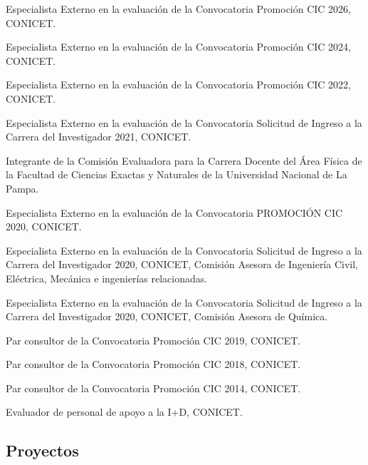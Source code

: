 \begin{timeline}
 Especialista Externo en la evaluación de la Convocatoria Promoción CIC 2026, CONICET.

 Especialista Externo en la evaluación de la Convocatoria Promoción CIC 2024, CONICET.

 Especialista Externo en la evaluación de la Convocatoria Promoción CIC 2022, CONICET.

 Especialista Externo en la evaluación de la Convocatoria Solicitud de Ingreso a la Carrera del Investigador 2021, CONICET.

 Integrante de la Comisión Evaluadora para la Carrera Docente del Área Física de la Facultad de Ciencias Exactas y Naturales de la Universidad Nacional de La Pampa.

 Especialista Externo en la evaluación de la Convocatoria PROMOCIÓN CIC 2020, CONICET.

 Especialista Externo en la evaluación de la Convocatoria Solicitud de Ingreso a la Carrera del Investigador 2020, CONICET, Comisión Asesora de Ingeniería Civil, Eléctrica, Mecánica e ingenierías relacionadas.

 Especialista Externo en la evaluación de la Convocatoria Solicitud de Ingreso a la Carrera del Investigador 2020, CONICET, Comisión Asesora de Química.

 Par consultor de la Convocatoria Promoción CIC 2019, CONICET.

 Par consultor de la Convocatoria Promoción CIC 2018, CONICET.

 Par consultor de la Convocatoria Promoción CIC 2014, CONICET.

 Evaluador de personal de apoyo a la I+D, CONICET.
\end{timeline}

\subsection{Proyectos}


